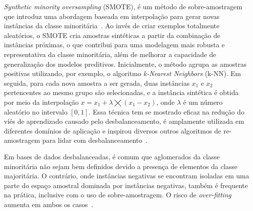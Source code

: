 \textit{Synthetic minority oversampling} (SMOTE), é um método de sobre-amostragem que introduz uma abordagem baseada em interpolação para gerar novas instâncias da classe minoritária~\cite{Wei2025}. Ao invés de criar exemplos totalmente aleatórios, o SMOTE cria amostras sintéticas a partir da combinação de instâncias próximas, o que contribui para uma modelagem mais robusta e representativa da classe minoritária, além de melhorar a capacidade de generalização dos modelos preditivos. Inicialmente, o método agrupa as amostras positivas utilizando, por exemplo, o algoritmo \textit{k-Nearest Neighbors} (k-NN). Em seguida, para cada nova amostra a ser gerada, duas instâncias \(x_{1}\) e \(x_{2}\) pertencentes ao mesmo grupo são selecionadas, e a instância sintética é obtida por meio da interpolação \(x = x_{1} + \lambda \bigtimes (x_{1} - x_{2})\), onde \(\lambda\) é um número aleatório no intervalo \([0, 1]\). Essa técnica tem se mostrado eficaz na redução do viés de aprendizado causado pelo desbalanceamento, é amplamente utilizada em diferentes domínios de aplicação e inspirou diversos outros algoritmos de re-amostragem para lidar com desbalanceamento~\cite{Fernndez2018}.

Em bases de dados desbalanceadas, é comum que aglomerados da classe minoritária não sejam bem definidos devido a presença de elementos da classe majoritária. O contrário, onde instâncias negativas se encontram isoladas em uma parte do espaço amostral dominada por instâncias negativas, também é frequente na prática, inclusive com o uso de sobre-amostragem. O risco de \textit{over-fitting} aumenta em ambos os casos~\cite{Batista2004}.